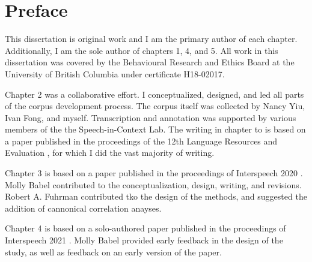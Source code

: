 
\chapter{Preface}

This dissertation is original work and I am the primary author of each chapter. Additionally, I am the sole author of chapters 1, 4, and 5. All work in this dissertation was covered by the Behavioural Research and Ethics Board at the University of British Columbia under certificate H18-02017. 

Chapter 2 was a collaborative effort. I conceptualized, designed, and led all parts of the corpus development process. The corpus itself was collected by Nancy Yiu, Ivan Fong, and myself. Transcription and annotation was supported by various members of the the Speech-in-Context Lab. The writing in chapter to is based on a paper published in the proceedings of the 12th Language Resources and Evaluation \citep{johnson_2020_spice}, for which I did the vast majority of writing. 

Chapter 3 is based on a paper published in the proceedings of Interspeech 2020 \citep{johnson_2020_bilingual}. Molly Babel contributed to the conceptualization, design, writing, and revisions. Robert A. Fuhrman contributed tko the design of the methods, and suggested the addition of cannonical correlation anayses. 

Chapter 4 is based on a solo-authored paper published in the proceedings of Interspeech 2021 \citep{johnson_2021_leveraging}. Molly Babel provided early feedback in the design of the study, as well as feedback on an early version of the paper. 


\endinput %
